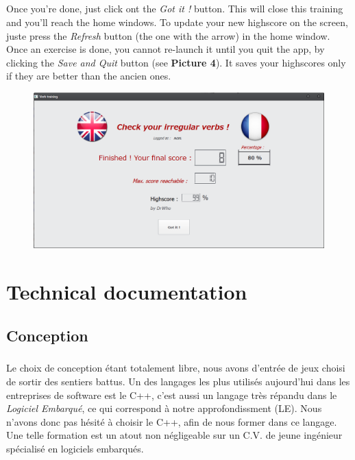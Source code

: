 \documentclass[12pt, a4paper]{report}
\begin{document}
\paragraph{}Once you're done, just click ont the \textit{Got it !} button. This will close this training and you'll reach the home windows. To update your new highscore on the screen, juste press the \textit{Refresh} button (the one with the arrow) in the home window. Once an exercise is done, you cannot re-launch it until you quit the app, by clicking the \textit{Save and Quit} button (see \textbf{Picture 4}). It saves your highscores only if they are better than the ancien ones.

\begin{figure}[H]
    \centering
    \includegraphics[scale=0.55]{images/high.png}
\end{figure}

\newpage
\chapter*{Technical documentation}

\section*{\hspace{0.6cm}Conception}

\paragraph{}Le choix de conception étant totalement libre, nous avons d'entrée de jeux choisi de sortir des sentiers battus. Un des langages les plus utilisés aujourd'hui dans les entreprises de software est le C++, c'est aussi un langage très répandu dans le \textit{Logiciel Embarqué}, ce qui correspond à notre approfondissment (LE). Nous n'avons donc pas hésité à choisir le C++, afin de nous former dans ce langage. Une telle formation est un atout non négligeable sur un C.V. de jeune ingénieur spécialisé en logiciels embarqués.
\end{document}
